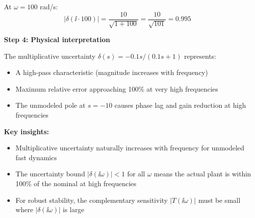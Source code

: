\documentclass[11pt,a4paper]{article}
\begin{document}
At $\omega = 100$ rad/s:
\begin{equation}
  |\delta(\ii \cdot 100)| = \frac{10}{\sqrt{1 + 100}} = \frac{10}{\sqrt{101}} = 0.995
\end{equation}

\textbf{Step 4: Physical interpretation}

The multiplicative uncertainty $\delta(s) = -0.1s/(0.1s+1)$ represents:
\begin{itemize}
  \item A high-pass characteristic (magnitude increases with frequency)
  \item Maximum relative error approaching 100\% at very high frequencies
  \item The unmodeled pole at $s = -10$ causes phase lag and gain reduction at high frequencies
\end{itemize}

\textbf{Key insights:}
\begin{itemize}
  \item Multiplicative uncertainty naturally increases with frequency for unmodeled fast dynamics
  \item The uncertainty bound $|\delta(\ii\omega)| < 1$ for all $\omega$ means the actual plant is within 100\% of the nominal at high frequencies
  \item For robust stability, the complementary sensitivity $|T(\ii\omega)|$ must be small where $|\delta(\ii\omega)|$ is large
\end{itemize}
\end{document}
